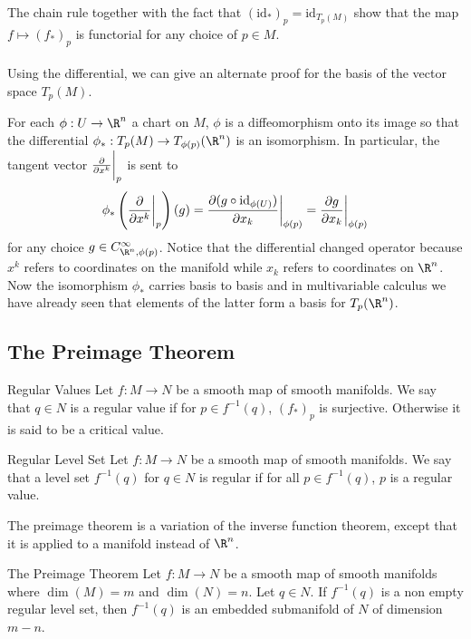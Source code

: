 \documentclass[a4paper]{article}
\begin{document}
The chain rule together with the fact that $(\text{id}_\ast)_p=\text{id}_{T_p(M)}$ show that the map $f\mapsto(f_\ast)_p$ is functorial for any choice of $p\in M$. \\~\\

Using the differential, we can give an alternate proof for the basis of the vector space $T_p(M)$. 

For each $\phi:U\to\R^n$ a chart on $M$, $\phi$ is a diffeomorphism onto its image so that the differential $\phi_\ast:T_p(M)\to T_{\phi(p)}(\R^n)$ is an isomorphism. In particular, the tangent vector $\frac{\partial}{\partial x^k}\bigg{|}_p$ is sent to $$\phi_\ast\left(\frac{\partial}{\partial x^k}\bigg{|}_p\right)(g)=\frac{\partial(g\circ\text{id}_{\phi(U)})}{\partial x_k}\bigg{|}_{\phi(p)}=\frac{\partial g}{\partial x_k}\bigg{|}_{\phi(p)}$$ for any choice $g\in C_{\R^n,\phi(p)}^\infty$. Notice that the differential changed operator because $x^k$ refers to coordinates on the manifold while $x_k$ refers to coordinates on $\R^n$. Now the isomorphism $\phi_\ast$ carries basis to basis and in multivariable calculus we have already seen that elements of the latter form a basis for $T_p(\R^n)$. 

\subsection{The Preimage Theorem}
\begin{defn}{Regular Values}{} Let $f:M\to N$ be a smooth map of smooth manifolds. We say that $q\in N$ is a regular value if for $p\in f^{-1}(q)$, $(f_\ast)_p$ is surjective. Otherwise it is said to be a critical value. 
\end{defn}

\begin{defn}{Regular Level Set}{} Let $f:M\to N$ be a smooth map of smooth manifolds. We say that a level set $f^{-1}(q)$ for $q\in N$ is regular if for all $p\in f^{-1}(q)$, $p$ is a regular value. 
\end{defn}

The preimage theorem is a variation of the inverse function theorem, except that it is applied to a manifold instead of $\R^n$. 

\begin{thm}{The Preimage Theorem}{} Let $f:M\to N$ be a smooth map of smooth manifolds where $\dim(M)=m$ and $\dim(N)=n$. Let $q\in N$. If $f^{-1}(q)$ is a non empty regular level set, then $f^{-1}(q)$ is an embedded submanifold of $N$ of dimension $m-n$. 
\end{thm}
\end{document}
